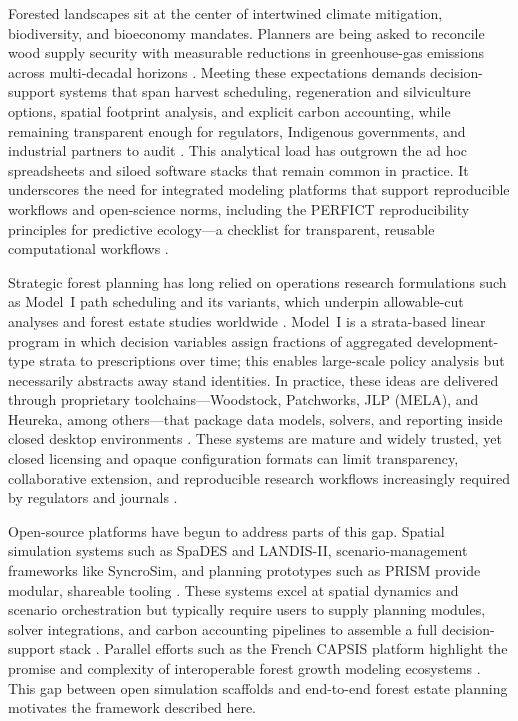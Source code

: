 \documentclass[review]{elsarticle}
\begin{document}
Forested landscapes sit at the center of intertwined climate mitigation, biodiversity, and bioeconomy mandates. Planners are being asked to reconcile wood supply security with measurable reductions in greenhouse-gas emissions across multi-decadal horizons \citep{canadell2022wgiii, griscom2017natural, fao2020fra}. Meeting these expectations demands decision-support systems that span harvest scheduling, regeneration and silviculture options, spatial footprint analysis, and explicit carbon accounting, while remaining transparent enough for regulators, Indigenous governments, and industrial partners to audit \citep{law2018land, smyth2020climate}. This analytical load has outgrown the ad hoc spreadsheets and siloed software stacks that remain common in practice. It underscores the need for integrated modeling platforms that support reproducible workflows and open-science norms, including the PERFICT reproducibility principles for predictive ecology---a checklist for transparent, reusable computational workflows \citep{hampton2015tao, lowndes2017path, mcintire2022perfict}.

Strategic forest planning has long relied on operations research formulations such as Model~I path scheduling and its variants, which underpin allowable-cut analyses and forest estate studies worldwide \citep{johnson1977techniques, gunn2007models, gunn2009some, paradis2013risk}. Model~I is a strata-based linear program in which decision variables assign fractions of aggregated development-type strata to prescriptions over time; this enables large-scale policy analysis but necessarily abstracts away stand identities. In practice, these ideas are delivered through proprietary toolchains---Woodstock, Patchworks, JLP (MELA), and Heureka, among others---that package data models, solvers, and reporting inside closed desktop environments \citep{remsoft-woodstock, patchworks, jlp_mela, heureka}. These systems are mature and widely trusted, yet closed licensing and opaque configuration formats can limit transparency, collaborative extension, and reproducible research workflows increasingly required by regulators and journals \citep{hampton2015tao}.

Open-source platforms have begun to address parts of this gap. Spatial simulation systems such as SpaDES and LANDIS-II, scenario-management frameworks like SyncroSim, and planning prototypes such as PRISM provide modular, shareable tooling \citep{spades, landisii, syncrosim, nguyen2022prism}. These systems excel at spatial dynamics and scenario orchestration but typically require users to supply planning modules, solver integrations, and carbon accounting pipelines to assemble a full decision-support stack \citep{daigneault2022forest, law2018land}. Parallel efforts such as the French CAPSIS platform highlight the promise and complexity of interoperable forest growth modeling ecosystems \citep{fortin2022altframework, fortin2022metamodel, power2015artemis}. This gap between open simulation scaffolds and end-to-end forest estate planning motivates the framework described here.
\end{document}

